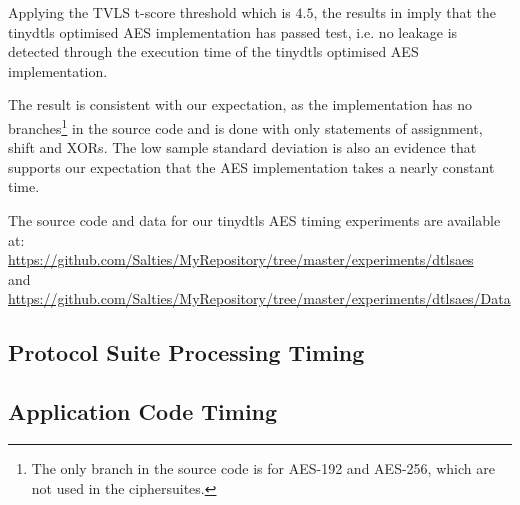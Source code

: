 Applying the TVLS t-score threshold which is $4.5$, the results in  imply that the tinydtls optimised AES implementation has passed test, i.e. no leakage is detected through the execution time of the tinydtls optimised AES implementation. 

The result is consistent with our expectation, as the implementation has no branches\footnote{The only branch in the source code is for AES-192 and AES-256, which are not used in the ciphersuites.} in the source code and is done with only statements of assignment, shift and XORs. The low sample standard deviation is also an evidence that supports our expectation that the AES implementation takes a nearly constant time.

The source code and data for our tinydtls AES timing experiments are available at: \\
\url{https://github.com/Salties/MyRepository/tree/master/experiments/dtlsaes} \\
and \\
\url{https://github.com/Salties/MyRepository/tree/master/experiments/dtlsaes/Data}

\subsection{Protocol Suite Processing Timing}

\subsection{Application Code Timing}




